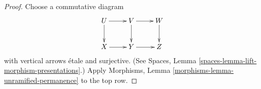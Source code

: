 \documentclass[10pt,a4paper]{amsart}
\theoremstyle{plain}
\theoremstyle{definition}
\theoremstyle{remark}
\numberwithin{equation}{subsection}
\begin{document}
\begin{proof}
Choose a commutative diagram
$$
\xymatrix{
U \ar[d] \ar[r] & V \ar[d] \ar[r] & W \ar[d] \\
X \ar[r] & Y \ar[r] & Z
}
$$
with vertical arrows \'etale and surjective. (See
Spaces, Lemma \ref{spaces-lemma-lift-morphism-presentations}.)
Apply
Morphisms, Lemma \ref{morphisms-lemma-unramified-permanence}
to the top row.
\end{proof}
\end{document}
